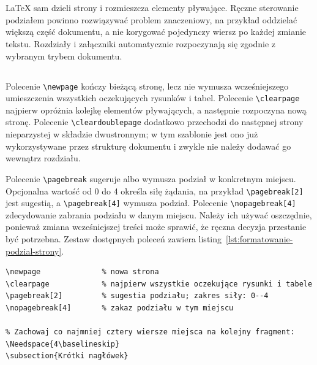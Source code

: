 \section{}

LaTeX sam dzieli strony i rozmieszcza elementy pływające. Ręczne sterowanie podziałem powinno rozwiązywać problem znaczeniowy, na przykład oddzielać większą część dokumentu, a nie korygować pojedynczy wiersz po każdej zmianie tekstu. Rozdziały i załączniki automatycznie rozpoczynają się zgodnie z wybranym trybem dokumentu.

\subsection{}

Polecenie \verb|\newpage| kończy bieżącą stronę, lecz nie wymusza wcześniejszego umieszczenia wszystkich oczekujących rysunków i tabel. Polecenie \verb|\clearpage| najpierw opróżnia kolejkę elementów pływających, a następnie rozpoczyna nową stronę. Polecenie \verb|\cleardoublepage| dodatkowo przechodzi do następnej strony nieparzystej w składzie dwustronnym; w tym szablonie jest ono już wykorzystywane przez strukturę dokumentu i zwykle nie należy dodawać go wewnątrz rozdziału.

Polecenie \verb|\pagebreak| sugeruje albo wymusza podział w konkretnym miejscu. Opcjonalna wartość od 0 do 4 określa siłę żądania, na przykład \verb|\pagebreak[2]| jest sugestią, a \verb|\pagebreak[4]| wymusza podział. Polecenie \verb|\nopagebreak[4]| zdecydowanie zabrania podziału w danym miejscu. Należy ich używać oszczędnie, ponieważ zmiana wcześniejszej treści może sprawić, że ręczna decyzja przestanie być potrzebna. Zestaw dostępnych poleceń zawiera listing~\ref{lst:formatowanie-podzial-strony}.

\begin{lstlisting}[style=thesis,caption={Polecenia sterujące podziałem strony},label={lst:formatowanie-podzial-strony}]
\newpage              % nowa strona
\clearpage            % najpierw wszystkie oczekujące rysunki i tabele
\pagebreak[2]         % sugestia podziału; zakres siły: 0--4
\nopagebreak[4]       % zakaz podziału w tym miejscu

% Zachowaj co najmniej cztery wiersze miejsca na kolejny fragment:
\Needspace{4\baselineskip}
\subsection{Krótki nagłówek}
\end{lstlisting}

